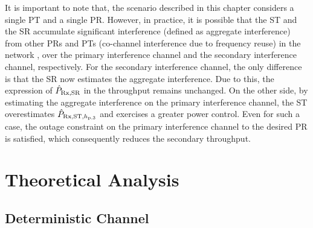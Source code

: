 It is important to note that, the scenario described in this chapter considers a single PT and a single PR. However, in practice, it is possible that the ST and the SR accumulate significant interference (defined as aggregate interference) from other PRs and PTs (co-channel interference due to frequency reuse) in the network \cite{Elsawy13_cmag},  over the primary interference channel and the secondary interference channel, respectively. For the secondary interference channel, the only difference is that the SR now estimates the aggregate interference. Due to this, the expression of $\hat{P}_{\text{Rx,SR}}$ in the throughput remains unchanged. On the other side, by estimating the aggregate interference on the primary interference channel, the ST overestimates $\hat{P}_{\text{Rx,ST,$h_{\text{p,3}}$}}$ and exercises a greater power control. Even for such a case, the outage constraint on the primary interference channel to the desired PR is satisfied, which consequently reduces the secondary throughput.  
\section{Theoretical Analysis} \label{sec_US:th_ana}

\subsection{Deterministic Channel} \label{ssec_US:stpa}

